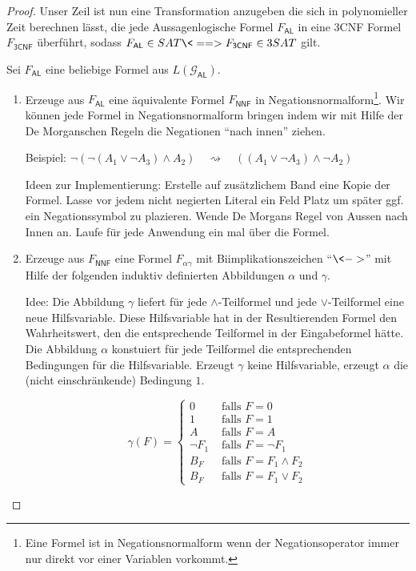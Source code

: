\begin{proof}
Unser Zeil ist nun eine Transformation anzugeben die sich in polynomieller Zeit berechnen lässt, die jede Aussagenlogische Formel $F_\mathsf{AL}$ in eine 3CNF Formel $F_\mathsf{3CNF}$ überführt, sodass 
$F_\mathsf{AL}\in SAT \<==> F_\mathsf{3CNF}\in 3SAT$
gilt.

Sei $F_\mathsf{AL}$ eine beliebige Formel aus $L(\mathcal{G}_\mathsf{AL})$.

\begin{enumerate}
 \item Erzeuge aus $F_\mathsf{AL}$ eine äquivalente Formel $F_\mathsf{NNF}$ in Negationsnormalform\footnote{Eine Formel ist in Negationsnormalform wenn der Negationsoperator immer nur direkt vor einer Variablen vorkommt.}.
 Wir können jede Formel in Negationsnormalform bringen indem wir mit Hilfe der De Morganschen Regeln die Negationen ``nach innen'' ziehen.
 
 Beispiel: $\neg(\neg (A_1\lor \neg A_3)\land A_2) \quad\rightsquigarrow\quad ((A_1\lor \neg A_3)\land \neg A_2)$
 
 Ideen zur Implementierung: Erstelle auf zusätzlichem Band eine Kopie der Formel. 
 Lasse vor jedem nicht negierten Literal ein Feld Platz um später ggf. ein Negationssymbol zu plazieren.
 Wende De Morgans Regel von Aussen nach Innen an.
 Laufe für jede Anwendung ein mal über die Formel.
 
 
 \item Erzeuge aus $F_\mathsf{NNF}$ eine Formel $F_{\alpha\gamma}$ mit Biimplikationszeichen ``$\<->$'' mit Hilfe der folgenden induktiv definierten Abbildungen $\alpha$ und $\gamma$.
 
 Idee: Die Abbildung $\gamma$ liefert für jede $\land$-Teilformel und jede $\lor$-Teilformel eine neue Hilfsvariable.
 Diese Hilfsvariable hat in der Resultierenden Formel den Wahrheitswert, den die entsprechende Teilformel in der Eingabeformel hätte.
 Die Abbildung $\alpha$ konstuiert für jede Teilformel die entsprechenden Bedingungen für die Hilfsvariable.
 Erzeugt $\gamma$ keine Hilfsvariable, erzeugt $\alpha$ die (nicht einschränkende) Bedingung $1$.
 
 $$\gamma(F)=
 \begin{cases}
   0 & \text{ falls } F=0\\
   1 & \text{ falls } F=1\\
   A & \text{ falls } F=A\\
   \neg F_1 & \text{ falls } F=\neg F_1\\
   B_F & \text{ falls } F=F_1\land F_2\\
   B_F & \text{ falls } F=F_1\lor F_2
  \end{cases}$$
 

\end{enumerate}
\end{proof}
